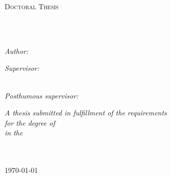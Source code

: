 \documentclass[
11pt, %
english, %
singlespacing, %
headsepline, %
chapterinoneline, %
]{MastersDoctoralThesis} %
\author{Alejandro Gil Gálvez} %
\begin{document}
%
\frontmatter %

\pagestyle{plain} %


\begin{titlepage}
\begin{center}

\vspace*{.06\textheight}
{\scshape\LARGE \univname\par}\vspace{1.5cm} %
\textsc{\Large Doctoral Thesis}\\[0.5cm] %

\HRule \\[0.4cm] %
{\huge \bfseries \ttitle\par}\vspace{0.4cm} %
\HRule \\[1.5cm] %
 
\begin{minipage}[t]{0.4\textwidth}
\begin{flushleft} \large
\emph{Author:}\\
\href{https://orcid.org/0000-0002-1081-2673}{\authorname} %
\end{flushleft}
\end{minipage}
\begin{minipage}[t]{0.4\textwidth}
\begin{flushright} \large
\emph{Supervisor:} \\
\href{https://orcid.org/0000-0001-8165-7984}{\supname} %

\end{flushright}
\end{minipage}\\[1cm]
\emph{Posthumous supervisor:}
\href{https://orcid.org/0000-0001-5125-4332}{\examname}
\vfill

\large \textit{A thesis submitted in fulfillment of the requirements\\ for the degree of \degreename}\\[0.3cm] %
\textit{in the}\\[0.4cm]
\groupname\\\deptname\\[2cm] %
 
\vfill

{\large \today}\\[4cm] %
 
\vfill
\end{center}
\end{titlepage}
\end{document}

